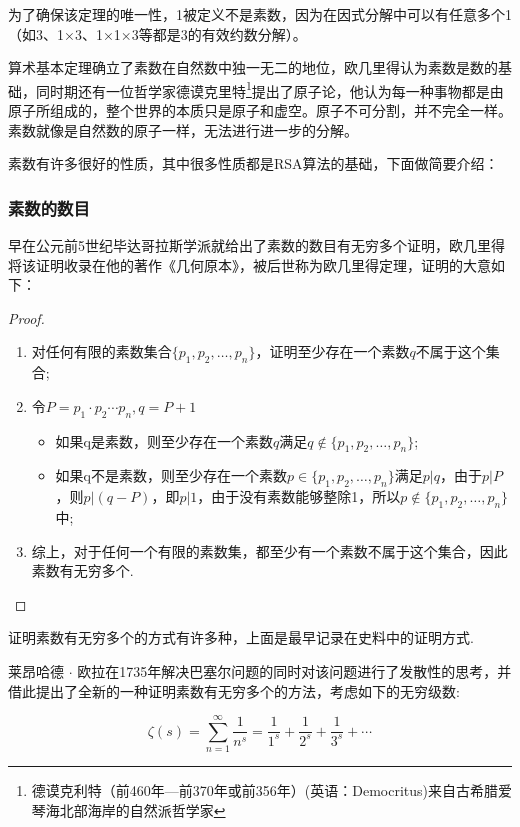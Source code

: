 \documentclass[UTF8]{ctexart}
\begin{document}
为了确保该定理的唯一性，1被定义不是素数，因为在因式分解中可以有任意多个1（如3、1×3、1×1×3等都是3的有效约数分解）。

算术基本定理确立了素数在自然数中独一无二的地位，欧几里得认为素数是数的基础，同时期还有一位哲学家德谟克里特\footnote{德谟克利特（前460年—前370年或前356年）(英语：Democritus)来自古希腊爱琴海北部海岸的自然派哲学家}提出了原子论，他认为每一种事物都是由原子所组成的，整个世界的本质只是原子和虚空。原子不可分割，并不完全一样。素数就像是自然数的原子一样，无法进行进一步的分解。

素数有许多很好的性质，其中很多性质都是RSA算法的基础，下面做简要介绍：

\subsubsection{素数的数目}

早在公元前5世纪毕达哥拉斯学派就给出了素数的数目有无穷多个证明，欧几里得将该证明收录在他的著作《几何原本》，被后世称为欧几里得定理，证明的大意如下：

\begin{proof}
	\begin{enumerate}
		\item 对任何有限的素数集合$\{p_1, p_2, \dots , p_n\}$，证明至少存在一个素数$q$不属于这个集合;

		\item 令$P = p_1 \cdot p_2 \cdots p_n, q = P + 1$
		      \begin{itemize}
			      \item 如果q是素数，则至少存在一个素数$q$满足$q\notin\{p_1, p_2, \dots, p_n\}$;
			      \item 如果q不是素数，则至少存在一个素数$p\in\{p_1, p_2,\dots, p_n\}$满足$p|q$，由于$p|P$，则$p|(q-P)$，即$p|1$，由于没有素数能够整除1，所以$p \notin \{p_1, p_2, \dots, p_n\}$中;
		      \end{itemize}
		\item 综上，对于任何一个有限的素数集，都至少有一个素数不属于这个集合，因此素数有无穷多个.
	\end{enumerate}
\end{proof}

证明素数有无穷多个的方式有许多种，上面是最早记录在史料中的证明方式.

莱昂哈德 $\cdot$ 欧拉在1735年解决巴塞尔问题的同时对该问题进行了发散性的思考，并借此提出了全新的一种证明素数有无穷多个的方法，考虑如下的无穷级数:

\begin{equation}
	\zeta(s) = \sum_{n=1}^{\infty}\frac{1}{n^s} = \frac{1}{1^s} + \frac{1}{2^s} + \frac{1}{3^s} + \cdots \label{euler_formula1} %
\end{equation}
\end{document}
